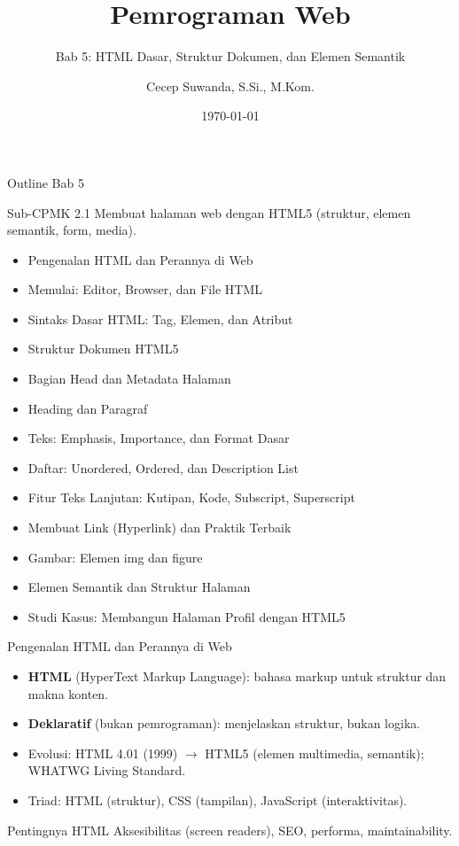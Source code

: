\documentclass[handout]{beamer}
\title[Bab 5 -- HTML Dasar]{Pemrograman Web}
\subtitle{Bab 5: HTML Dasar, Struktur Dokumen, dan Elemen Semantik}
\author{Cecep Suwanda, S.Si., M.Kom.}
\institute{Universitas Bale Bandung}
\date{\today}
\begin{document}
\begin{frame}
	\titlepage
\end{frame}

\begin{frame}[shrink=15]{Outline Bab 5}
	\begin{block}{Sub-CPMK 2.1}
		Membuat halaman web dengan HTML5 (struktur, elemen semantik, form, media).
	\end{block}
	\begin{itemize}
		\item Pengenalan HTML dan Perannya di Web
		\item Memulai: Editor, Browser, dan File HTML
		\item Sintaks Dasar HTML: Tag, Elemen, dan Atribut
		\item Struktur Dokumen HTML5
		\item Bagian Head dan Metadata Halaman
		\item Heading dan Paragraf
		\item Teks: Emphasis, Importance, dan Format Dasar
		\item Daftar: Unordered, Ordered, dan Description List
		\item Fitur Teks Lanjutan: Kutipan, Kode, Subscript, Superscript
		\item Membuat Link (Hyperlink) dan Praktik Terbaik
		\item Gambar: Elemen img dan figure
		\item Elemen Semantik dan Struktur Halaman
		\item Studi Kasus: Membangun Halaman Profil dengan HTML5
	\end{itemize}
\end{frame}

\begin{frame}{Pengenalan HTML dan Perannya di Web}
	\begin{itemize}
		\item \textbf{HTML} (HyperText Markup Language): bahasa markup untuk struktur dan makna konten.
		\item \textbf{Deklaratif} (bukan pemrograman): menjelaskan struktur, bukan logika.
		\item Evolusi: HTML 4.01 (1999) $\to$ HTML5 (elemen multimedia, semantik); WHATWG Living Standard.
		\item Triad: HTML (struktur), CSS (tampilan), JavaScript (interaktivitas).
	\end{itemize}
	\begin{block}{Pentingnya HTML}
		Aksesibilitas (screen readers), SEO, performa, maintainability.
	\end{block}
\end{frame}
\end{document}
